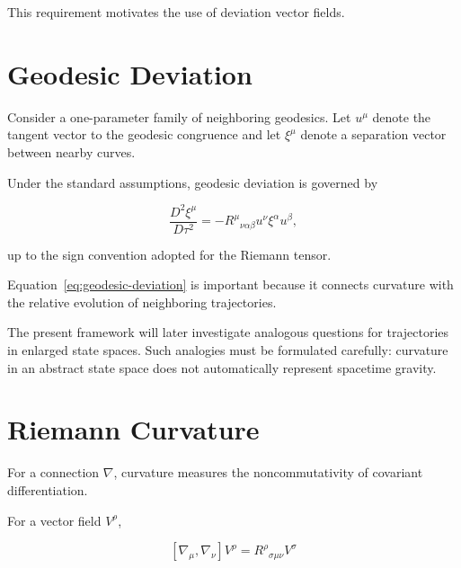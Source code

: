 \documentclass[12pt,oneside]{book}
\begin{document}
This requirement motivates the use of deviation vector fields.


\section{Geodesic Deviation}
\label{sec:geodesic-deviation}

Consider a one-parameter family of neighboring geodesics. Let
\(u^\mu\) denote the tangent vector to the geodesic congruence
and let \(\xi^\mu\) denote a separation vector between nearby
curves.

Under the standard assumptions, geodesic deviation is governed
by

\begin{equation}
    \frac{D^2\xi^\mu}{D\tau^2}
    =
    -
    R^\mu{}_{\nu\alpha\beta}
    u^\nu
    \xi^\alpha
    u^\beta,
    \label{eq:geodesic-deviation}
\end{equation}

up to the sign convention adopted for the Riemann tensor.

Equation~\eqref{eq:geodesic-deviation} is important because it
connects curvature with the relative evolution of neighboring
trajectories.

The present framework will later investigate analogous questions
for trajectories in enlarged state spaces. Such analogies must
be formulated carefully: curvature in an abstract state space
does not automatically represent spacetime gravity.


\section{Riemann Curvature}
\label{sec:riemann-curvature}

For a connection \(\nabla\), curvature measures the
noncommutativity of covariant differentiation.

For a vector field \(V^\rho\),

\begin{equation}
    \left[
        \nabla_\mu,
        \nabla_\nu
    \right]
    V^\rho
    =
    R^\rho{}_{\sigma\mu\nu}
    V^\sigma
\end{equation}
\end{document}
